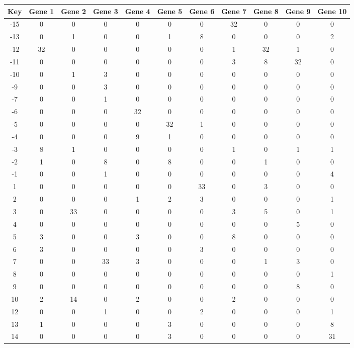 \begin{tabular}{|c|c|c|c|c|c|c|c|c|c|c|}
\hline
Key & Gene 1 & Gene 2 & Gene 3 & Gene 4 & Gene 5 & Gene 6 & Gene 7 & Gene 8 & Gene 9 & Gene 10 \\
\hline
-15 & 0 & 0 & 0 & 0 & 0 & 0 & 32 & 0 & 0 & 0 \\
-13 & 0 & 1 & 0 & 0 & 1 & 8 & 0 & 0 & 0 & 2 \\
-12 & 32 & 0 & 0 & 0 & 0 & 0 & 1 & 32 & 1 & 0 \\
-11 & 0 & 0 & 0 & 0 & 0 & 0 & 3 & 8 & 32 & 0 \\
-10 & 0 & 1 & 3 & 0 & 0 & 0 & 0 & 0 & 0 & 0 \\
-9 & 0 & 0 & 3 & 0 & 0 & 0 & 0 & 0 & 0 & 0 \\
-7 & 0 & 0 & 1 & 0 & 0 & 0 & 0 & 0 & 0 & 0 \\
-6 & 0 & 0 & 0 & 32 & 0 & 0 & 0 & 0 & 0 & 0 \\
-5 & 0 & 0 & 0 & 0 & 32 & 1 & 0 & 0 & 0 & 0 \\
-4 & 0 & 0 & 0 & 9 & 1 & 0 & 0 & 0 & 0 & 0 \\
-3 & 8 & 1 & 0 & 0 & 0 & 0 & 1 & 0 & 1 & 1 \\
-2 & 1 & 0 & 8 & 0 & 8 & 0 & 0 & 1 & 0 & 0 \\
-1 & 0 & 0 & 1 & 0 & 0 & 0 & 0 & 0 & 0 & 4 \\
1 & 0 & 0 & 0 & 0 & 0 & 33 & 0 & 3 & 0 & 0 \\
2 & 0 & 0 & 0 & 1 & 2 & 3 & 0 & 0 & 0 & 1 \\
3 & 0 & 33 & 0 & 0 & 0 & 0 & 3 & 5 & 0 & 1 \\
4 & 0 & 0 & 0 & 0 & 0 & 0 & 0 & 0 & 5 & 0 \\
5 & 3 & 0 & 0 & 3 & 0 & 0 & 8 & 0 & 0 & 0 \\
6 & 3 & 0 & 0 & 0 & 0 & 3 & 0 & 0 & 0 & 0 \\
7 & 0 & 0 & 33 & 3 & 0 & 0 & 0 & 1 & 3 & 0 \\
8 & 0 & 0 & 0 & 0 & 0 & 0 & 0 & 0 & 0 & 1 \\
9 & 0 & 0 & 0 & 0 & 0 & 0 & 0 & 0 & 8 & 0 \\
10 & 2 & 14 & 0 & 2 & 0 & 0 & 2 & 0 & 0 & 0 \\
12 & 0 & 0 & 1 & 0 & 0 & 2 & 0 & 0 & 0 & 1 \\
13 & 1 & 0 & 0 & 0 & 3 & 0 & 0 & 0 & 0 & 8 \\
14 & 0 & 0 & 0 & 0 & 3 & 0 & 0 & 0 & 0 & 31 \\
\hline
\end{tabular}